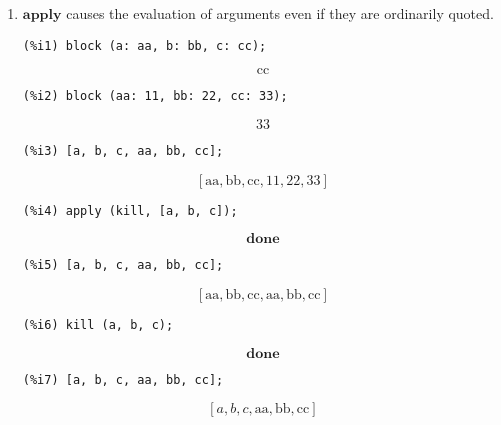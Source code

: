 \documentclass[12pt,leqno]{article}
\begin{document}
\begin{enumerate}
\item $\mathbf{apply}$ causes the evaluation of arguments even if they are ordinarily quoted.
\begin{verbatim}
(%i1) block (a: aa, b: bb, c: cc);
\end{verbatim}
\begin{equation}
\mathrm{cc}\tag{\%o1}
\label{eq:doc-group1-code19-1-1}
\end{equation}
\begin{verbatim}
(%i2) block (aa: 11, bb: 22, cc: 33);
\end{verbatim}
\begin{equation}
33\tag{\%o2}
\label{eq:doc-group1-code19-2-1}
\end{equation}
\begin{verbatim}
(%i3) [a, b, c, aa, bb, cc];
\end{verbatim}
\begin{equation}
\left[ \mathrm{aa} , \mathrm{bb} , \mathrm{cc} , 11 , 22 , 33 \right] \tag{\%o3}
\label{eq:doc-group1-code19-3-1}
\end{equation}
\begin{verbatim}
(%i4) apply (kill, [a, b, c]);
\end{verbatim}
\begin{equation}
\mathbf{done}\tag{\%o4}
\label{eq:doc-group1-code19-4-1}
\end{equation}
\begin{verbatim}
(%i5) [a, b, c, aa, bb, cc];
\end{verbatim}
\begin{equation}
\left[ \mathrm{aa} , \mathrm{bb} , \mathrm{cc} , \mathrm{aa} , \mathrm{bb} , \mathrm{cc} \right] \tag{\%o5}
\label{eq:doc-group1-code19-5-1}
\end{equation}
\begin{verbatim}
(%i6) kill (a, b, c);
\end{verbatim}
\begin{equation}
\mathbf{done}\tag{\%o6}
\label{eq:doc-group1-code19-6-1}
\end{equation}
\begin{verbatim}
(%i7) [a, b, c, aa, bb, cc];
\end{verbatim}
\begin{equation}
\left[ a , b , c , \mathrm{aa} , \mathrm{bb} , \mathrm{cc} \right] \tag{\%o7}
\label{eq:doc-group1-code19-7-1}
\end{equation}



\end{enumerate}
\end{document}
